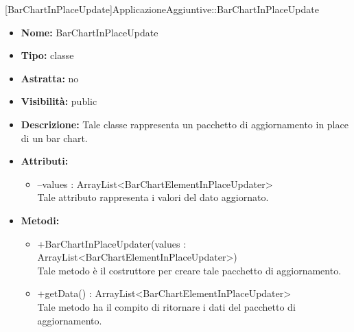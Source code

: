 			[BarChartInPlaceUpdate]{ApplicazioneAggiuntive::BarChartInPlaceUpdate}
			

	
			
			\begin{itemize}
			\item \textbf{Nome:} BarChartInPlaceUpdate
			\item \textbf{Tipo:} classe
			
		\item \textbf{Astratta:}
		no
			\item \textbf{Visibilità:} public
			\item \textbf{Descrizione:} Tale classe rappresenta un pacchetto di aggiornamento in place di un bar chart.
			\item \textbf{Attributi:}
				\begin{itemize}
				\setlength{\itemsep}{5pt}
				
					\item[\ding{111}] {--values : ArrayList<BarChartElementInPlaceUpdater>} \\ [1mm] Tale attributo rappresenta i valori del dato aggiornato.
				\end{itemize}
		
			\item \textbf{Metodi:}
				\begin{itemize}
				\setlength{\itemsep}{5pt}
				
					\item[\ding{111}] {{+BarChartInPlaceUpdater(values : ArrayList<BarChartElementInPlaceUpdater>)}} \\ [1mm] Tale metodo è il costruttore per creare tale pacchetto di aggiornamento.
					\item[\ding{111}] {{+getData() : ArrayList<BarChartElementInPlaceUpdater>}} \\ [1mm] Tale metodo ha il compito di ritornare i dati del pacchetto di aggiornamento.
				\end{itemize}
		
			\end{itemize}
	
